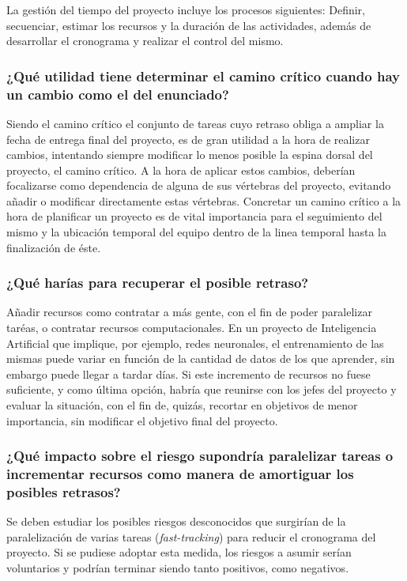 \documentclass{article}
\begin{document}
La gestión del tiempo del proyecto incluye los procesos siguientes: Definir, secuenciar, estimar los recursos y la duración de las actividades, además de desarrollar el cronograma y realizar el control del mismo.

\subsubsection{¿Qué utilidad tiene determinar el camino crítico cuando hay un cambio como el del enunciado?}

Siendo el camino crítico el conjunto de tareas cuyo retraso obliga a ampliar la fecha de entrega final del proyecto, es de gran utilidad a la hora de realizar cambios, intentando siempre modificar lo menos posible la espina dorsal del proyecto, el camino crítico. A la hora de aplicar estos cambios, deberían focalizarse como dependencia de alguna de sus vértebras del proyecto, evitando añadir o modificar directamente estas vértebras. Concretar un camino crítico a la hora de planificar un proyecto es de vital importancia para el seguimiento del mismo y la ubicación temporal del equipo dentro de la linea temporal hasta la finalización de éste.

\subsubsection{¿Qué harías para recuperar el posible retraso?}

Añadir recursos como contratar a más gente, con el fin de poder paralelizar taréas, o contratar recursos computacionales. En un proyecto de Inteligencia Artificial que implique, por ejemplo, redes neuronales, el entrenamiento de las mismas puede variar en función de la cantidad de datos de los que aprender, sin embargo puede llegar a tardar días. Si este incremento de recursos no fuese suficiente, y como última opción, habría que reunirse con los jefes del proyecto y evaluar la situación, con el fin de, quizás, recortar en objetivos de menor importancia, sin modificar el objetivo final del proyecto.

\subsubsection{¿Qué impacto sobre el riesgo supondría paralelizar tareas o incrementar recursos como manera de amortiguar los posibles retrasos?}

Se deben estudiar los posibles riesgos desconocidos que surgirían de la paralelización de varias tareas (\textit{fast-tracking}) para reducir el cronograma del proyecto. Si se pudiese adoptar esta medida, los riesgos a asumir serían voluntarios y podrían terminar siendo tanto positivos, como negativos.
\end{document}
